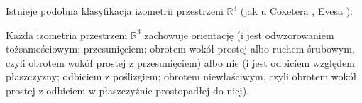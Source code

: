 Istnieje podobna klasyfikacja izometrii przestrzeni $\mathbb R^3$ (jak u Coxetera \cite[s. 113-122]{coxeter_1967}, Evesa \cite[s. 148]{eves1_1972}):

\begin{proposition}
    Każda izometria przestrzeni $\mathbb R^3$ zachowuje orientację (i jest odwzorowaniem tożsamościowym; przesunięciem; obrotem wokół prostej albo ruchem śrubowym, czyli obrotem wokół prostej z przesunięciem) albo nie (i jest odbiciem względem płaszczyzny; odbiciem z poślizgiem; obrotem niewłaściwym, czyli obrotem wokół prostej z odbiciem w płaszczyźnie prostopadłej do niej).
\end{proposition}

%